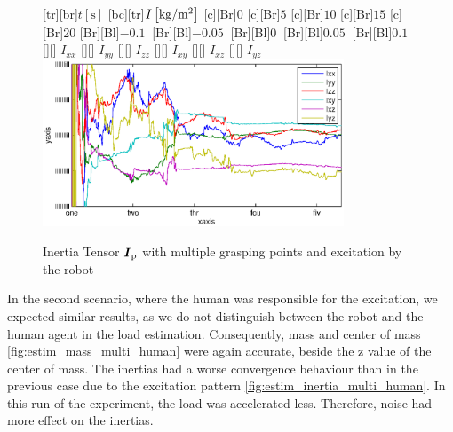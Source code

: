 \begin{figure}
	\centering	
	[tr][br]{$t\left[\mathrm{s}\right]$}
	[bc][tr]{$I\left[\mathrm{kg}/\mathrm{m}^2\right]$}
	[Br]{$0$}
	[Br]{$5$}
	[Br]{$10$}
	[Br]{$15$}
	[Br]{$20$}
	[Br][Bl]{$-0.1\  $}
	[Br][Bl]{$-0.05\ $}
	[Br][Bl]{$0\  $}
	[Br][Bl]{$0.05\  $}
	[Br][Bl]{$0.1\  $}
	[][]{\tiny \hspace{0.2cm} $I_{xx}$}
	[][]{\tiny \hspace{0.2cm} $I_{yy}$}
	[][]{\tiny \hspace{0.2cm} $I_{zz}$}
	[][]{\tiny \hspace{0.2cm} $I_{xy}$}
	[][]{\tiny \hspace{0.2cm} $I_{xz}$}
	[][]{\tiny \hspace{0.2cm} $I_{yz}$}
	\includegraphics[width=0.8\textwidth]{figures/multiple_grasping_points_robot_inertias.eps}
	\vspace{0.2cm}
	\caption[Inertia errors, multiple grasping points, excitation by robot]{Inertia Tensor $\boldsymbol{I}_{\mathrm{p}}$ with multiple grasping points and excitation by the robot}
	\label{fig:estim_inertia_multi_robot}
\end{figure}

In the second scenario, where the human was responsible for the excitation, we expected similar results, as we do not distinguish between the robot and the human agent in the load estimation. Consequently, mass and center of mass \ref{fig:estim_mass_multi_human} were again accurate, beside the z value of the center of mass. The inertias had a worse convergence behaviour than in the previous case due to the excitation pattern \ref{fig:estim_inertia_multi_human}. In this run of the experiment, the load was accelerated less. Therefore, noise had more effect on the inertias.

